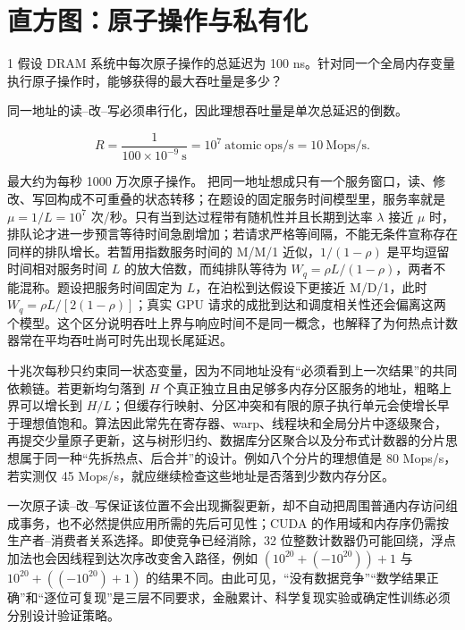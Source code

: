 \chapter{直方图：原子操作与私有化}

\begin{solutionexercise}{1}
\problemheading 假设 DRAM 系统中每次原子操作的总延迟为 100 ns。针对同一个全局内存变量
执行原子操作时，能够获得的最大吞吐量是多少？

\approachheading 同一地址的读--改--写必须串行化，因此理想吞吐量是单次总延迟的倒数。

\answerheading
\[
R=\frac{1}{100\times10^{-9}\ \mathrm{s}}
 =10^7\ \mathrm{atomic\ ops/s}
 =10\ \mathrm{Mops/s}.
\]

\conclusionheading 最大约为每秒 1000 万次原子操作。
\discussionheading
{}把同一地址想成只有一个服务窗口，读、修改、写回构成不可重叠的状态转移；在题设的固定服务时间模型里，服务率就是 $\mu=1/L=10^7$ 次/秒。只有当到达过程带有随机性并且长期到达率 $\lambda$ 接近 $\mu$ 时，排队论才进一步预言等待时间急剧增加；若请求严格等间隔，不能无条件宣称存在同样的排队增长。若暂用指数服务时间的 M/M/1 近似，$1/(1-\rho)$ 是平均逗留时间相对服务时间 $L$ 的放大倍数，而纯排队等待为 $W_q=\rho L/(1-\rho)$，两者不能混称。题设把服务时间固定为 $L$，在泊松到达假设下更接近 M/D/1，此时 $W_q=\rho L/[2(1-\rho)]$；真实 GPU 请求的成批到达和调度相关性还会偏离这两个模型。这个区分说明吞吐上界与响应时间不是同一概念，也解释了为何热点计数器常在平均吞吐尚可时先出现长尾延迟。

十兆次每秒只约束同一状态变量，因为不同地址没有“必须看到上一次结果”的共同依赖链。若更新均匀落到 $H$ 个真正独立且由足够多内存分区服务的地址，粗略上界可以增长到 $H/L$；但缓存行映射、分区冲突和有限的原子执行单元会使增长早于理想值饱和。算法因此常先在寄存器、warp、线程块和全局分片中逐级聚合，再提交少量原子更新，这与树形归约、数据库分区聚合以及分布式计数器的分片思想属于同一种“先拆热点、后合并”的设计。例如八个分片的理想值是 80 Mops/s，若实测仅 45 Mops/s，就应继续检查这些地址是否落到少数内存分区。

一次原子读--改--写保证该位置不会出现撕裂更新，却不自动把周围普通内存访问组成事务，也不必然提供应用所需的先后可见性；CUDA 的作用域和内存序仍需按生产者--消费者关系选择。即使竞争已经消除，32 位整数计数器仍可能回绕，浮点加法也会因线程到达次序改变舍入路径，例如 $(10^{20}+(-10^{20}))+1$ 与 $10^{20}+((-10^{20})+1)$ 的结果不同。由此可见，“没有数据竞争”“数学结果正确”和“逐位可复现”是三层不同要求，金融累计、科学复现实验或确定性训练必须分别设计验证策略。


\end{solutionexercise}
